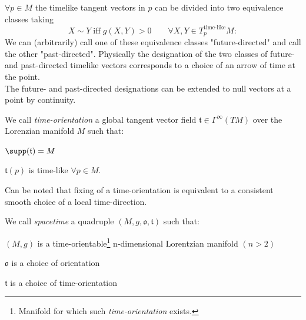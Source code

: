 \documentclass[Main]{subfiles}
\begin{document}
			\begin{observation}%

				$\forall p\in M$ the timelike tangent vectors in $p$ can be divided into two equivalence classes taking
				\begin{displaymath}
					X \sim Y \; \textrm{iff} \; g(X,Y)>0 \qquad \forall X,Y \in T^\textrm{time-like}_pM:
				\end{displaymath}
				We can (arbitrarily) call one of these equivalence classes "future-directed" and call the other "past-directed". Physically the designation of the two classes of future- and past-directed timelike vectors corresponds to a choice of an arrow of time at the point.
				\\
				The future- and past-directed designations can be extended to null vectors at a point by continuity.
			\end{observation}

			\begin{definition}
				We call \emph{time-orientation} a global tangent vector field  $\mathfrak{t}\in \Gamma^\infty(TM)$ over the Lorenzian manifold $M$
				such that:
				\begin{compactitemize}
					\item $\supp(\mathfrak{t}) = M$
					\item $\mathfrak{t}(p)$ is time-like $\forall p \in M$.
				\end{compactitemize}
			\end{definition}
				Can be noted that fixing of a time-orientation is equivalent to a consistent smooth choice of a local time-direction.

			\begin{definition}[Spacetime]
				We call \emph{spacetime} a quadruple $(M, g, \mathfrak{o}, \mathfrak{t})$ such that:
				\begin{compactitemize}
					\item $(M,g)$ is a time-orientable\footnote{Manifold for which such \emph{time-orientation} exists.} n-dimensional Lorentzian manifold $(n>2)$
					\item $\mathfrak{o}$ is a choice of orientation
					\item $\mathfrak{t}$ is a choice of time-orientation
				\end{compactitemize}
			\end{definition}
\end{document}

